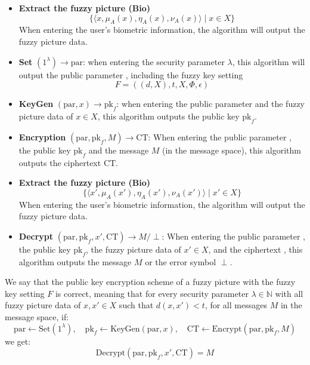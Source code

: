 \documentclass[graybox]{svmult}
\begin{document}
\begin{itemize}
    \item \textbf{Extract the fuzzy picture (Bio)}
          \[
              \{ \langle x, \mu_A(x), \eta_A(x), \nu_A(x) \rangle \mid x \in X \}
          \]
          When entering the user's biometric information, the algorithm will output the fuzzy picture data.

    \item \textbf{Set} $(1^\lambda) \to \text{par}$: when entering the security parameter $\lambda$, this algorithm will output the public parameter , including the fuzzy key setting
          \[
              F = ((d, X), t, X, \Phi, \epsilon)
          \]

    \item \textbf{KeyGen} $(\text{par}, x) \to \text{pk}_f$: when entering the public parameter  and the fuzzy picture data of $x \in X$, this algorithm outputs the public key $\text{pk}_f$.

    \item \textbf{Encryption} $(\text{par}, \text{pk}_f, M) \to \text{CT}$: When entering the public parameter , the public key $\text{pk}_f$ and the message $M$ (in the message space), this algorithm outputs the ciphertext $\text{CT}$.

    \item \textbf{Extract the fuzzy picture (Bio)}
          \[
              \{ \langle x', \mu_A(x'), \eta_A(x'), \nu_A(x') \rangle \mid x' \in X \}
          \]
          When entering the user's biometric information, the algorithm will output the fuzzy picture data.

    \item \textbf{Decrypt} $(\text{par}, \text{pk}_f, x', \text{CT}) \to M/\perp$: When entering the public parameter , the public key $\text{pk}_f$, the fuzzy picture data of $x' \in X$, and the ciphertext , this algorithm outputs the message $M$ or the error symbol $\perp$.

\end{itemize}

We say that the public key encryption scheme of a fuzzy picture with the fuzzy key setting $F$ is correct, meaning that for every security parameter $\lambda \in \mathbb{N}$ with all fuzzy picture data of $x, x' \in X$ such that $d(x, x') < t$, for all messages $M$ in the message space, if:
\[
    \text{par} \leftarrow \text{Set}(1^\lambda), \quad \text{pk}_f \leftarrow \text{KeyGen}(\text{par}, x), \quad \text{CT} \leftarrow \text{Encrypt}(\text{par}, \text{pk}_f, M)
\]
we get:
\[
    \text{Decrypt}(\text{par}, \text{pk}_f, x', \text{CT}) = M
\]
\end{document}
